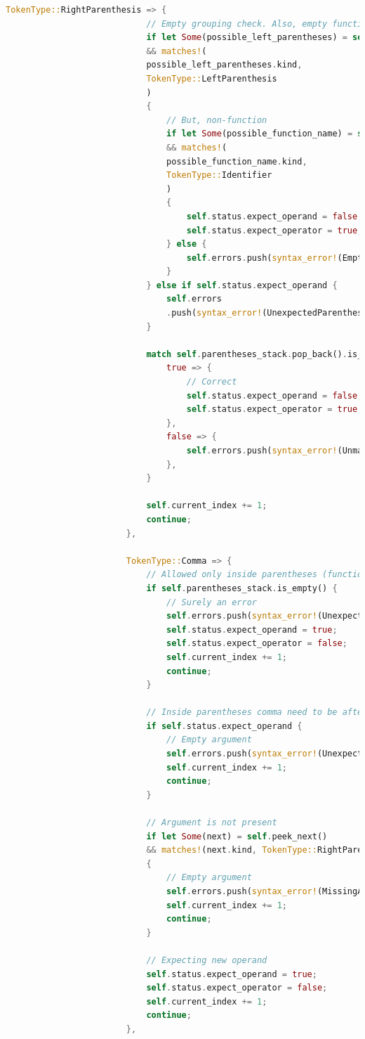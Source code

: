 \documentclass[14pt, a4paper]{extreport}
\begin{document}
\begin{lstlisting}[language=Rust]
						TokenType::RightParenthesis => {
							// Empty grouping check. Also, empty function is not an error.
							if let Some(possible_left_parentheses) = self.peek_previous()
							&& matches!(
							possible_left_parentheses.kind,
							TokenType::LeftParenthesis
							)
							{
								// But, non-function
								if let Some(possible_function_name) = self.peek_previous_by(2)
								&& matches!(
								possible_function_name.kind,
								TokenType::Identifier
								)
								{
									self.status.expect_operand = false;
									self.status.expect_operator = true;
								} else {
									self.errors.push(syntax_error!(EmptyParentheses, token));
								}
							} else if self.status.expect_operand {
								self.errors
								.push(syntax_error!(UnexpectedParenthesis, token));
							}
							
							match self.parentheses_stack.pop_back().is_some() {
								true => {
									// Correct
									self.status.expect_operand = false;
									self.status.expect_operator = true;
								},
								false => {
									self.errors.push(syntax_error!(UnmatchedParenthesis, token))
								},
							}
							
							self.current_index += 1;
							continue;
						},
						
						TokenType::Comma => {
							// Allowed only inside parentheses (function)
							if self.parentheses_stack.is_empty() {
								// Surely an error
								self.errors.push(syntax_error!(UnexpectedComma, token));
								self.status.expect_operand = true;
								self.status.expect_operator = false;
								self.current_index += 1;
								continue;
							}
							
							// Inside parentheses comma need to be after operand and before new operand
							if self.status.expect_operand {
								// Empty argument
								self.errors.push(syntax_error!(UnexpectedComma, token));
								self.current_index += 1;
								continue;
							}
							
							// Argument is not present
							if let Some(next) = self.peek_next()
							&& matches!(next.kind, TokenType::RightParenthesis)
							{
								// Empty argument
								self.errors.push(syntax_error!(MissingArgument, token));
								self.current_index += 1;
								continue;
							}
							
							// Expecting new operand
							self.status.expect_operand = true;
							self.status.expect_operator = false;
							self.current_index += 1;
							continue;
						},
						

\end{lstlisting}
\end{document}
